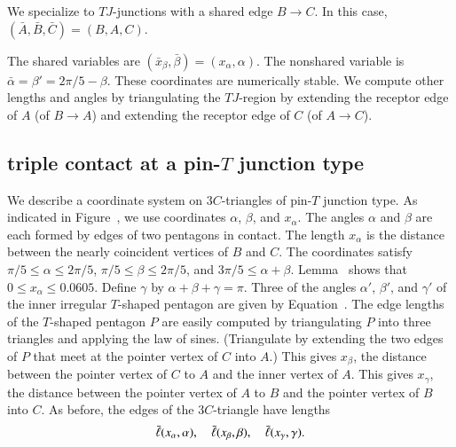 We specialize to $TJ$-junctions with a shared edge $B\to C$.
In this case, $(\bar A,\bar B,\bar C)=(B,A,C)$.

The shared variables are $(\bar x_\beta,\bar\beta)=(x_\alpha,\alpha)$.
The nonshared variable is $\bar\alpha=\beta'=2\pi/5-\beta$.  These
coordinates are numerically stable.  We compute other lengths and
angles by triangulating the $TJ$-region by extending the receptor edge
of $A$ (of $B\to A$) and extending the receptor edge of $C$ (of $A\to
C$).

\subsection{triple contact at a pin-$T$ junction type}
We describe a coordinate system on $3C$-triangles of pin-$T$ junction
type.  As indicated in Figure~, we use coordinates
$\alpha$, $\beta$, and $x_\alpha$.  The angles $\alpha$ and $\beta$
are each formed by edges of two pentagons in contact.  The length
$x_\alpha$ is the distance between the nearly coincident vertices of
$B$ and $C$.  The coordinates satisfy $\pi/5 \le \alpha \le 2\pi/5$,
$\pi/5\le \beta \le 2\pi/5$, and $3\pi/5 \le \alpha+\beta$.
Lemma~ shows that $0\le x_\alpha\le 0.0605$.  Define
$\gamma$ by $\alpha+\beta+\gamma = \pi$.  Three of the angles
$\alpha'$, $\beta'$, and $\gamma'$ of the inner irregular $T$-shaped
pentagon are given by Equation~.  The edge lengths of the
$T$-shaped pentagon $P$ are easily computed by triangulating $P$ into
three triangles and applying the law of sines.  (Triangulate by
extending the two edges of $P$ that meet at the pointer vertex of $C$
into $A$.)  This gives $x_\beta$, the distance between the pointer
vertex of $C$ to $A$ and the inner vertex of $A$.  This gives
$x_\gamma$, the distance between the pointer vertex of $A$ to $B$ and
the pointer vertex of $B$ into $C$.  As before, the edges of the
$3C$-triangle have lengths
\[
\bar\ell(x_\alpha,\alpha),\quad \bar\ell(x_\beta,\beta),\quad \bar\ell(x_\gamma,\gamma).
\]



